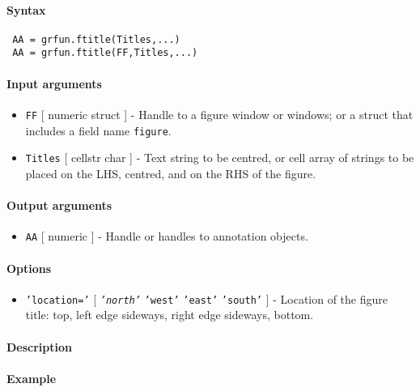 


	\paragraph{Syntax}
 
 \begin{verbatim}
 AA = grfun.ftitle(Titles,...)
 AA = grfun.ftitle(FF,Titles,...)
 \end{verbatim}
 
 \paragraph{Input arguments}
 
 \begin{itemize}
 \item
   \texttt{FF} {[} numeric \textbar{} struct {]} - Handle to a figure
   window or windows; or a struct that includes a field name
   \texttt{figure}.
 \item
   \texttt{Titles} {[} cellstr \textbar{} char {]} - Text string to be
   centred, or cell array of strings to be placed on the LHS, centred,
   and on the RHS of the figure.
 \end{itemize}
 
 \paragraph{Output arguments}
 
 \begin{itemize}
 \item
   \texttt{AA} {[} numeric {]} - Handle or handles to annotation objects.
 \end{itemize}
 
 \paragraph{Options}
 
 \begin{itemize}
 \item
   \texttt{'location='} {[} \emph{\texttt{'north'}} \textbar{}
   \texttt{'west'} \textbar{} \texttt{'east'} \textbar{} \texttt{'south'}
   {]} - Location of the figure title: top, left edge sideways, right
   edge sideways, bottom.
 \end{itemize}
 
 \paragraph{Description}
 
 \paragraph{Example}


